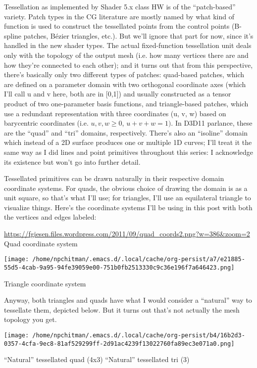 \documentclass[12pt]{article}
\begin{document}
Tessellation as implemented by Shader 5.x class HW is of the “patch-based” variety. Patch types in the CG literature are mostly named by what kind of function is used to construct the tessellated points from the control points (B-spline patches, Bézier triangles, etc.). But we’ll ignore that part for now, since it’s handled in the new shader types. The actual fixed-function tessellation unit deals only with the topology of the output mesh (i.e. how many vertices there are and how they’re connected to each other); and it turns out that from this perspective, there’s basically only two different types of patches: quad-based patches, which are defined on a parameter domain with two orthogonal coordinate axes (which I’ll call u and v here, both are in [0,1]) and usually constructed as a tensor product of two one-parameter basis functions, and triangle-based patches, which use a redundant representation with three coordinates (u, v, w) based on barycentric coordinates (i.e. \(u, v, w \ge 0\), \(u + v + w = 1)\). In D3D11 parlance, these are the “quad” and “tri” domains, respectively. There’s also an “isoline” domain which instead of a 2D surface produces one or multiple 1D curves; I’ll treat it the same way as I did lines and point primitives throughout this series: I acknowledge its existence but won’t go into further detail.

Tessellated primitives can be drawn naturally in their respective domain coordinate systems. For quads, the obvious choice of drawing the domain is as a unit square, so that’s what I’ll use; for triangles, I’ll use an equilateral triangle to visualize things. Here’s the coordinate systems I’ll be using in this post with both the vertices and edges labeled:

\url{https://fgiesen.files.wordpress.com/2011/09/quad\_coords2.png?w=386\&zoom=2}
Quad coordinate system

\begin{center}
\texttt{[image: /home/npchitman/.emacs.d/.local/cache/org-persist/a7/e21885-55d5-4cab-9a95-94fe39059e00-751b0fb2513330c9c36e196f7a646423.png]}
\end{center}
Triangle coordinate system

Anyway, both triangles and quads have what I would consider a “natural” way to tessellate them, depicted below. But it turns out that’s not actually the mesh topology you get.

\begin{center}
\texttt{[image: /home/npchitman/.emacs.d/.local/cache/org-persist/b4/16b2d3-0357-4cfa-9ec8-81af529299ff-2d91ac4239f13022760fa89ec3e071a0.png]}
\end{center}
``Natural'' tessellated quad (4x3) ``Natural'' tessellated tri (3)
\end{document}
